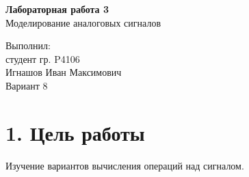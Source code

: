 \documentclass[12pt]{article}
\begin{document}



\begin{center}
	\LARGE 
	\textbf{Лабораторная работа 3}\\
	Моделирование аналоговых сигналов
	\\[3\baselineskip]
\end{center}

\begin{flushright}
	\large
	Выполнил:\\
	студент гр. P4106\\
	Игнашов Иван Максимович\\
	Вариант 8\\
\end{flushright}

\newpage

 \section*{1. Цель работы}
Изучение вариантов вычисления операций над сигналом.
\end{document}
